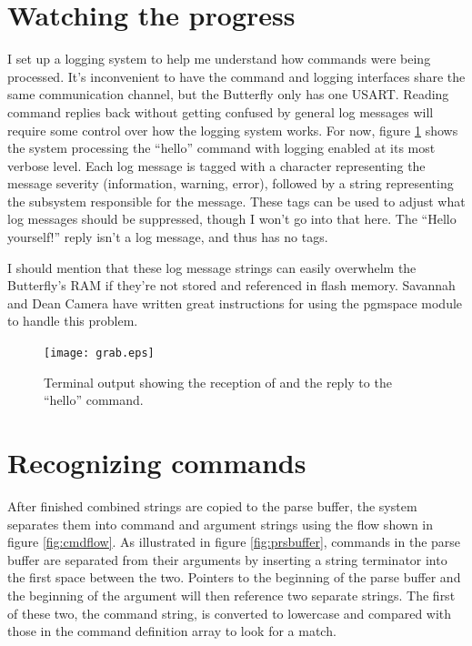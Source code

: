 \clearpage{}
\section{Watching the progress}
I set up a logging system to help me understand how commands were being processed.  It's inconvenient to have the command and logging interfaces share the same communication channel, but the Butterfly only has one USART.  Reading command replies back without getting confused by general log messages will require some control over how the logging system works.  For now, figure \ref{fig:termgrab} shows the system processing the ``hello'' command with logging enabled at its most verbose level.  Each log message is tagged with a character representing the message severity (information, warning, error), followed by a string representing the subsystem responsible for the message.  These tags can be used to adjust what log messages should be suppressed, though I won't go into that here.  The ``Hello yourself!'' reply isn't a log message, and thus has no tags.

I should mention that these log message strings can easily overwhelm the Butterfly's RAM if they're not stored and referenced in flash memory.  Savannah\cite{url:savannah:pgmspace} and Dean Camera\cite{url:deancamera:pgmspace} have written great instructions for using the pgmspace module to handle this problem.

\begin{figure}[ht]
    \begin{center}
        \texttt{[image: grab.eps]}
        \caption{Terminal output showing the reception of and the reply to the ``hello'' command.\label{fig:termgrab}}
    \end{center}
\end{figure}




\clearpage{}
\section{Recognizing commands}
After finished combined strings are copied to the parse buffer, the system separates them into command and argument strings using the flow shown in figure \ref{fig:cmdflow}.  As illustrated in figure \ref{fig:prsbuffer}, commands in the parse buffer are separated from their arguments by inserting a string terminator into the first space between the two.  Pointers to the beginning of the parse buffer and the beginning of the argument will then reference two separate strings.  The first of these two, the command string, is converted to lowercase and compared with those in the command definition array to look for a match.

